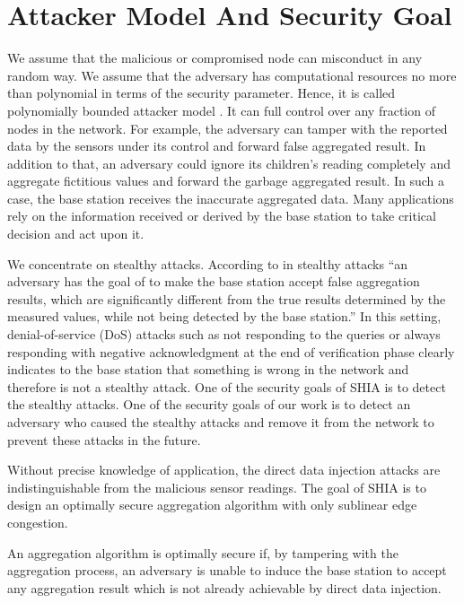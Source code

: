\section{Attacker Model And Security Goal}
	We assume that the malicious or compromised node can misconduct in any random way.
	We assume that the adversary has computational resources no more than polynomial in terms of the security parameter. 
	Hence, it is called polynomially bounded attacker model \cite{przydatek2003sia}.
	It can full control over any fraction of nodes in the network. 
	For example, the adversary can tamper with the reported data by the sensors under its control and forward false aggregated result.
	In addition to that, an adversary could ignore its children's reading completely and aggregate fictitious values and forward the garbage aggregated result.
	In such a case, the base station receives the inaccurate aggregated data. 
	Many applications rely on the information received or derived by the base station to take critical decision and act upon it.

	We concentrate on stealthy attacks. According to  \cite{przydatek2003sia} in stealthy attacks ``an adversary has the goal of to make the base station accept false aggregation results, which are significantly different from the true results determined by the measured values, while not being detected by the base station.''
	In this setting, denial-of-service (DoS) attacks such as not responding to the queries or always responding with negative acknowledgment at the end of verification phase clearly indicates to the base station that something is wrong in the network and therefore is not a stealthy attack.
	One of the security goals of SHIA is to detect the stealthy attacks.
	One of the security goals of our work is to detect an adversary who caused the stealthy attacks and remove it from the network to prevent these attacks in the future.
	
	Without precise knowledge of application, the direct data injection attacks are indistinguishable from the malicious sensor readings.
	The goal of SHIA is to design an optimally secure aggregation algorithm with only sublinear edge congestion.
	\begin{definition}
		\label{def:optimally-secure}
		\cite{chan2006secure} An aggregation algorithm is optimally secure if, by tampering with the aggregation process, an adversary is unable to induce the base station to accept any aggregation result which is not already achievable by direct data injection.
	\end{definition}

